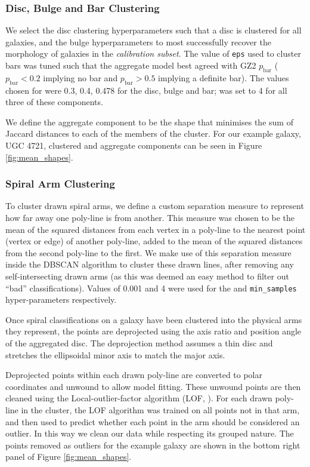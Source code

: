 \documentclass[trackchanges]{aastex63}
\begin{document}
\subsubsection{Disc, Bulge and Bar Clustering}

We select the disc clustering hyperparameters such that a disc is clustered for all galaxies, and the bulge hyperparameters to most successfully recover the morphology of galaxies in the \textit{calibration subset}. The value of \texttt{eps} used to cluster bars was tuned such that the aggregate model best agreed with GZ2 $p_\mathrm{bar}$ ($p_\mathrm{bar} < 0.2$ implying no bar and $p_\mathrm{bar} > 0.5$ implying a definite bar). The values chosen for  were 0.3, 0.4, 0.478 for the disc, bulge and bar;  was set to 4 for all three of these components.

We define the aggregate component to be the shape that minimises the sum of Jaccard distances to each of the members of the cluster. For our example galaxy, UGC 4721, clustered and aggregate components can be seen in Figure \ref{fig:mean_shapes}.

\subsubsection{Spiral Arm Clustering}
\label{sec:spiral_clustering}
To cluster drawn spiral arms, we define a custom separation measure to represent how far away one poly-line is from another. This measure was chosen to be the mean of the squared distances from each vertex in a poly-line to the nearest point (vertex or edge) of another poly-line, added to the mean of the squared distances from the second poly-line to the first. We make use of this separation measure inside the DBSCAN algorithm to cluster these drawn lines, after removing any self-intersecting drawn arms (as this was deemed an easy method to filter out ``bad'' classifications). Values of 0.001 and 4 were used for the  and \texttt{min\_samples} hyper-parameters respectively.

Once spiral classifications on a galaxy have been clustered into the physical arms they represent, the points are deprojected using the axis ratio and position angle of the aggregated disc. The deprojection method assumes a thin disc and stretches the ellipsoidal minor axis to match the major axis.

Deprojected points within each drawn poly-line are converted to polar coordinates and unwound to allow model fitting. These unwound points are then cleaned using the Local-outlier-factor algorithm (LOF, \citealt{local-outlier-factor}). For each drawn poly-line in the cluster, the LOF algorithm was trained on all points not in that arm, and then used to predict whether each point in the arm should be considered an outlier. In this way we clean our data while respecting its grouped nature. The points removed as outliers for the example galaxy are shown in the bottom right panel of Figure \ref{fig:mean_shapes}.
\end{document}

